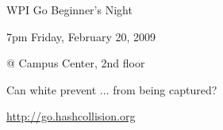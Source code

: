 \documentclass{article}
\begin{document}
\centerline{\Huge WPI Go Beginner's Night}
\centerline{\Huge 7pm Friday, February 20, 2009}
\centerline{\Huge @ Campus Center, 2nd floor}
\vfill

\begin{center}
\hugegoban
\showgoban
\end{center}

\vfill
\centerline{\Huge Can white prevent ... from being captured?}
\centerline{\Huge \url{http://go.hashcollision.org}}
\end{document}
